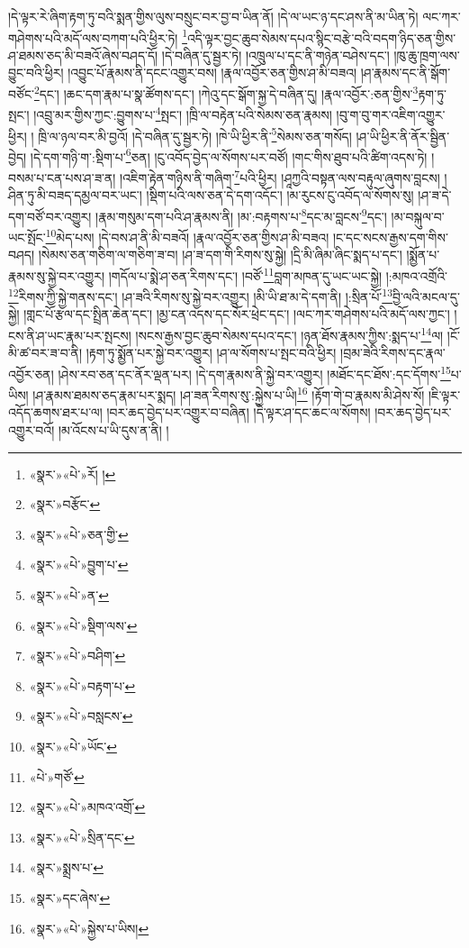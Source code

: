 །དེ་ལྟར་རེ་ཞིག་རྟག་ཏུ་བའི་སྨན་གྱིས་ལུས་བསྲུང་བར་བྱ་བ་ཡིན་ནོ། །དེ་ལ་ཡང་ཉ་དང་ཤས་ནི་མ་ཡིན་ཏེ། ལང་ཀར་གཤེགས་པའི་མདོ་ལས་བཀག་པའི་ཕྱིར་ཏེ། \footnote{«སྣར་»«པེ་»རོ། ། }འདི་ལྟར་བྱང་ཆུབ་སེམས་དཔའ་སྙིང་བརྩེ་བའི་བདག་ཉིད་ཅན་གྱིས་ཤ་ཐམས་ཅད་མི་བཟའོ་ཞེས་བཤད་དོ། །དེ་བཞིན་དུ་སྦྱར་ཏེ། །འཁྲུལ་པ་དང་ནི་གཉེན་བཤེས་དང་། །ཁུ་ཆུ་ཁྲག་ལས་བྱུང་བའི་ཕྱིར། །འབྱུང་པོ་རྣམས་ནི་དངང་འགྱུར་བས། །རྣལ་འབྱོར་ཅན་གྱིས་ཤ་མི་བཟའ། །ཤ་རྣམས་དང་ནི་སྒོག་བཙོང་\footnote{«སྣར་»བརྩོང་}དང་། །ཆང་དག་རྣམ་པ་སྣ་ཚོགས་དང་། །ཀེའུ་དང་སྒོག་སྐྱ་དེ་བཞིན་དུ། །རྣལ་འབྱོར་:ཅན་གྱིས་\footnote{«སྣར་»«པེ་»ཅན་གྱི་}རྟག་ཏུ་སྤང་། །འབྲུ་མར་གྱིས་ཀྱང་:བྱུགས་པ་\footnote{«སྣར་»«པེ་»བྱུག་པ་}སྤང་། །ཁྲི་ལ་བརྟེན་པའི་སེམས་ཅན་རྣམས། །བུ་ག་བུ་གར་འཇིག་འགྱུར་ཕྱིར། །
ཁྲི་ལ་ཉལ་བར་མི་བྱའོ། །དེ་བཞིན་དུ་སྦྱར་ཏེ། །ཁེ་ཡི་ཕྱིར་ནི་\footnote{«སྣར་»«པེ་»ན་}སེམས་ཅན་གསོད། །ཤ་ཡི་ཕྱིར་ནི་ནོར་སྦྱིན་བྱེད། །དེ་དག་གཉི་ག་:སྡིག་པ་\footnote{«སྣར་»«པེ་»སྡིག་ལས་}ཅན། །ངུ་འབོད་བྱེད་ལ་སོགས་པར་བཙོ། །གང་གིས་ཐུབ་པའི་ཚིག་འདས་ཏེ། །བསམ་པ་ངན་པས་ཤ་ཟ་ན། །འཇིག་རྟེན་གཉིས་ནི་གཞིག་\footnote{«སྣར་»«པེ་»བཤིག་}པའི་ཕྱིར། །ཤཱཀྱའི་བསྟན་ལས་བརྟུལ་ཞུགས་བླངས། །ཤིན་ཏུ་མི་བཟད་དམྱལ་བར་ཡང་། །སྡིག་པའི་ལས་ཅན་དེ་དག་འདོང་། །མ་རུངས་ངུ་འབོད་ལ་སོགས་སུ། །ཤ་ཟ་དེ་དག་བཙོ་བར་འགྱུར། །རྣམ་གསུམ་དག་པའི་ཤ་རྣམས་ནི། །མ་:བརྟགས་པ་\footnote{«སྣར་»«པེ་»བརྟག་པ་}དང་མ་བླངས་\footnote{«སྣར་»«པེ་»བསླངས་}དང་། །མ་བསྐུལ་བ་ཡང་སྤོང་\footnote{«སྣར་»«པེ་»ཡོང་}མེད་པས། །དེ་བས་ཤ་ནི་མི་བཟའོ། །རྣལ་འབྱོར་ཅན་གྱིས་ཤ་མི་བཟའ། །ང་དང་སངས་རྒྱས་དག་གིས་བཤད། །སེམས་ཅན་གཅིག་ལ་གཅིག་ཟ་བ། །ཤ་ཟ་དག་གི་རིགས་སུ་སྐྱེ། །དྲི་མི་ཞིམ་ཞིང་སྨད་པ་དང་། །སྨྱོན་པ་རྣམས་སུ་སྐྱེ་བར་འགྱུར། །གདོལ་པ་སྨེ་ཤ་ཅན་རིགས་དང་། །བཙོ་\footnote{«པེ་»གཙོ་}བླག་མཁན་དུ་ཡང་ཡང་སྐྱེ། །:མཁའ་འགྲོའི་\footnote{«སྣར་»«པེ་»མཁའ་འགྲོ་}རིགས་ཀྱི་སྐྱེ་གནས་དང་། །ཤ་ཟའི་རིགས་སུ་སྐྱེ་བར་འགྱུར། །མི་ཡི་ཐ་མ་དེ་དག་ནི། །:སྲིན་པོ་\footnote{«སྣར་»«པེ་»སྲིན་དང་}བྱི་ལའི་མངལ་དུ་སྐྱེ། །གླང་པོ་རྩལ་དང་སྤྲིན་ཆེན་དང་། །མྱ་ངན་འདས་དང་སོར་ཕྲེང་དང་། །ལང་ཀར་གཤེགས་པའི་མདོ་ལས་ཀྱང་། །ངས་ནི་ཤ་ཡང་རྣམ་པར་སྤངས། །སངས་རྒྱས་བྱང་ཆུབ་སེམས་དཔའ་དང་། །ཉན་ཐོས་རྣམས་ཀྱིས་:སྨད་པ་\footnote{«སྣར་»སྨྲས་པ་}ལ། །ངོ་མི་ཚ་བར་ཟ་བ་ནི། །རྟག་ཏུ་སྨྱོན་པར་སྐྱེ་བར་འགྱུར། །ཤ་ལ་སོགས་པ་སྤང་བའི་ཕྱིར། །བྲམ་ཟེའི་རིགས་དང་རྣལ་འབྱོར་ཅན། །ཤེས་རབ་ཅན་དང་ནོར་ལྡན་པར། །དེ་དག་རྣམས་ནི་སྐྱེ་བར་འགྱུར། །མཐོང་དང་ཐོས་:དང་དོགས་\footnote{«སྣར་»དང་ཞེས་}པ་ཡིས། །ཤ་རྣམས་ཐམས་ཅད་རྣམ་པར་སྨད། །ཤ་ཟན་རིགས་སུ་:སྐྱེས་པ་ཡི།\footnote{«སྣར་»«པེ་»སྐྱེས་པ་ཡིས།} །རྟོག་གེ་བ་རྣམས་མི་ཤེས་སོ། །ཇི་ལྟར་འདོད་ཆགས་ཐར་པ་ལ། །བར་ཆད་བྱེད་པར་འགྱུར་བ་བཞིན། །དེ་ལྟར་ཤ་དང་ཆང་ལ་སོགས། །བར་ཆད་བྱེད་པར་འགྱུར་བའོ། །མ་འོངས་པ་ཡི་དུས་ན་ནི། །
